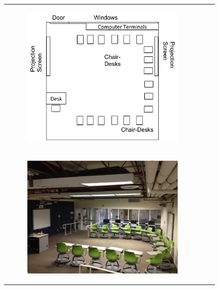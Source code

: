 \documentclass[11pt,letterpaper]{article}
\begin{document}
\begin{figure}
{\begin{tabular}{ccc}
\begin{subfigure}[b]{0.33\textwidth}\includegraphics[width=\textwidth]{figures/classroom-u-shaped.pdf}\caption{}\label{fig:classroom-c}\end{subfigure}\\
\begin{subfigure}[b]{0.33\textwidth}\includegraphics[width=\textwidth]{figures/classroom-u-photo.jpg}\caption{}\label{fig:classroom-d}\end{subfigure}&

\end{tabular}}
\end{figure}
\end{document}
